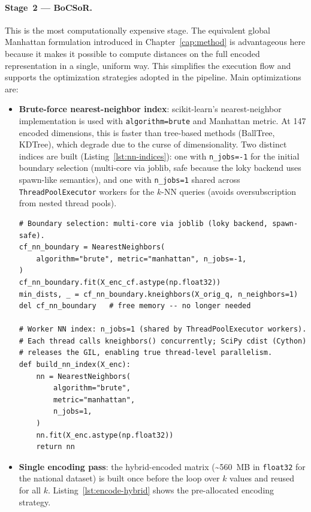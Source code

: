 \paragraph{Stage~2 --- BoCSoR.}
This is the most computationally expensive stage.
The equivalent global Manhattan formulation introduced in Chapter~\ref{cap:method}
is advantageous here because it makes it possible to compute distances on the
full encoded representation in a single, uniform way. This simplifies the
execution flow and supports the optimization strategies adopted in the
pipeline.
Main optimizations are:

\begin{itemize}
  \item \textbf{Brute-force nearest-neighbor index}: scikit-learn's nearest-neighbor implementation is used with \texttt{algorithm=\textquotesingle brute\textquotesingle} and Manhattan metric.
  At 147 encoded dimensions, this is faster than tree-based methods (BallTree, KDTree), which degrade due to the curse of dimensionality.
  Two distinct indices are built (Listing~\ref{lst:nn-indices}): one with \texttt{n\_jobs=-1} for the initial boundary selection (multi-core via joblib, safe because the loky backend uses spawn-like semantics), and one with \texttt{n\_jobs=1} shared across \texttt{ThreadPoolExecutor} workers for the $k$-NN queries (avoids oversubscription from nested thread pools).

\begin{lstlisting}[style=pipeline,caption={Two NN index configurations for boundary selection and worker queries (\texttt{src/feature\_importance.py}).},label={lst:nn-indices}]
# Boundary selection: multi-core via joblib (loky backend, spawn-safe).
cf_nn_boundary = NearestNeighbors(
    algorithm="brute", metric="manhattan", n_jobs=-1,
)
cf_nn_boundary.fit(X_enc_cf.astype(np.float32))
min_dists, _ = cf_nn_boundary.kneighbors(X_orig_q, n_neighbors=1)
del cf_nn_boundary   # free memory -- no longer needed

# Worker NN index: n_jobs=1 (shared by ThreadPoolExecutor workers).
# Each thread calls kneighbors() concurrently; SciPy cdist (Cython)
# releases the GIL, enabling true thread-level parallelism.
def build_nn_index(X_enc):
    nn = NearestNeighbors(
        algorithm="brute",
        metric="manhattan",
        n_jobs=1,
    )
    nn.fit(X_enc.astype(np.float32))
    return nn
\end{lstlisting}

  \item \textbf{Single encoding pass}: the hybrid-encoded matrix (\textasciitilde560~MB in \texttt{float32} for the national dataset) is built once before the loop over $k$ values and reused for all $k$.
  Listing~\ref{lst:encode-hybrid} shows the pre-allocated encoding strategy.


\end{itemize}
